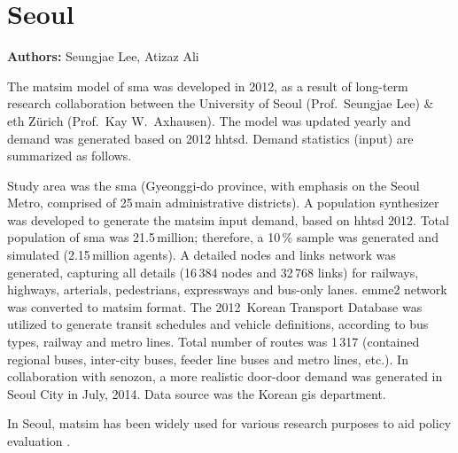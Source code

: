 \chapter{Seoul}
\label{ch:seoul}
\hfill \textbf{Authors:} Seungjae Lee, Atizaz Ali


The \gls{matsim} model of \gls{sma} was developed in 2012, as a result of long-term research collaboration between the University of Seoul (Prof.\ Seungjae Lee) \& \gls{eth} Zürich (Prof.\ Kay W.\ Axhausen). The model was updated yearly and demand was generated based on 2012 \gls{hhtsd}. Demand statistics (input) are summarized as follows. 

Study area was the \gls{sma} (Gyeonggi-do province, with emphasis on the Seoul Metro,  comprised of 25\,main administrative districts). A population synthesizer was developed to generate the \gls{matsim} input demand, based on \gls{hhtsd} 2012. Total population of \gls{sma} was 21.5\,million; therefore, a 10\,\% sample was generated and simulated (2.15\,million agents). A detailed nodes and links network was generated, capturing all details (16\,384 nodes and 32\,768 links) for railways, highways, arterials, pedestrians, expressways and bus-only lanes. \gls{emme2} network was converted to \gls{matsim} format. The 2012~Korean Transport Database was utilized to generate transit schedules and vehicle definitions, according to bus types, railway and metro lines. Total number of routes was 1\,317 (contained regional buses, inter-city buses, feeder line buses and metro lines, etc.). In collaboration with \gls{senozon}, a more realistic door-door demand was generated in Seoul City in July, 2014. Data source was the Korean \gls{gis} department.

In Seoul, \gls{matsim} has been widely used for various research purposes to aid policy evaluation \citet[e.g.,][]{KimEtAl_IJHE_2012, LeeAli_unpub_IWUTSCD_2014}.

